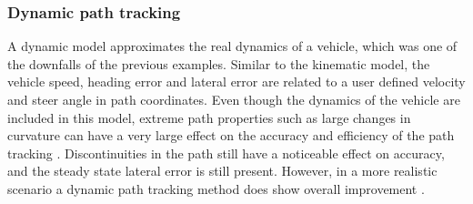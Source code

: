 \documentclass[main.tex]{subfiles}
\begin{document}
\subsubsection{Dynamic path tracking}
A dynamic model approximates the real dynamics of a vehicle, which was one of the downfalls of the previous examples. Similar to the kinematic model, the vehicle speed, heading error and lateral error are related to a user defined velocity and steer angle in path coordinates. Even though the dynamics of the vehicle are included in this model, extreme path properties such as large changes in curvature can have a very large effect on the accuracy and efficiency of the path tracking \parencite{snider2009}. Discontinuities in the path still have a noticeable effect on accuracy, and the steady state lateral error is still present. However, in a more realistic scenario a dynamic path tracking method does show overall improvement \parencite{snider2009}.
\end{document}
